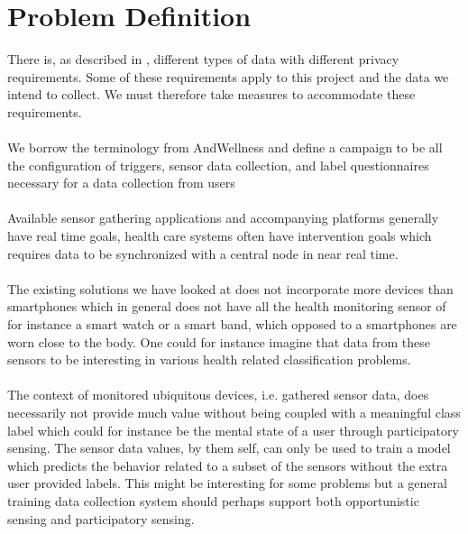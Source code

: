 
\section{Problem Definition} 
\label{sec:problem_definition}
There is, as described in , different types of data with different privacy requirements. Some of these requirements apply to this project and the data we intend to collect. We must therefore take measures to accommodate these requirements. 
\\\\
We borrow the terminology from AndWellness \parencite{hicks2010andwellness} and define a campaign to be all the configuration of triggers, sensor data collection, and label questionnaires necessary for a data collection from users    
\\\\
Available sensor gathering applications and accompanying platforms generally have real time goals, health care systems often have intervention goals which requires data to be synchronized with a central node in near real time. 
\\\\
The existing solutions we have looked at does not incorporate more devices than smartphones which in general does not have all the health monitoring sensor of for instance a smart watch or a smart band, which opposed to a smartphones are worn close to the body. One could for instance imagine that data from these sensors to be interesting in various health related classification problems. 
\\\\
The context of monitored ubiquitous devices, i.e. gathered sensor data, does necessarily not provide much value without being coupled with a meaningful class label which could for instance be the mental state of a user through participatory sensing. The sensor data values, by them self, can only be used to train a model which predicts the behavior related to a subset of the sensors without the extra user provided labels. This might be interesting for some problems but a general training data collection system should perhaps support both opportunistic sensing and participatory sensing. 

